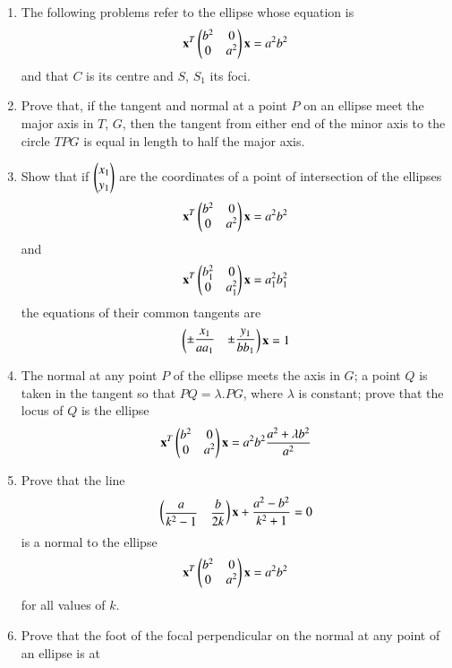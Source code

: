 \renewcommand{\theequation}{\theenumi}
\begin{enumerate}[label=\arabic*.,ref=\thesubsection.\theenumi]
\item The following problems refer to the ellipse whose 
equation is
\begin{align}
\mathbf{x}^T\begin{pmatrix}b^2 & 0\\0 & a^2\end{pmatrix}\mathbf{x} =a^2b^2
\end{align}
and that $C$ is its centre and $S$, $S_1$ its foci.

\item Prove that, if the tangent and normal at a point $P$ on an ellipse meet the major axis
in $T$, $G$, then the tangent from either end of the minor axis to the circle $TPG$ is equal in length to half the major
axis.
\item Show that if $\begin{pmatrix}x_1\\y_1\end{pmatrix}$ are the coordinates of a point of intersection of the ellipses
\begin{align}
\mathbf{x}^T\begin{pmatrix}b^2 & 0\\0 & a^2\end{pmatrix}\mathbf{x} =a^2b^2
\end{align}
 and 
\begin{align}
\mathbf{x}^T\begin{pmatrix}b_1^2 & 0\\0 & a_1^2\end{pmatrix}\mathbf{x} =a_1^2b_1^2
\end{align}
the equations of their common tangents are 
\begin{align}
\begin{pmatrix}\pm \dfrac{x_1}{aa_1} & \pm \dfrac{y_1}{bb_1}\end{pmatrix}\mathbf{x} = 1
\end{align}
\item The normal at any point $P$ of the ellipse meets the axis in $G$; a point $Q$ is taken in the
tangent so that $PQ=\lambda.PG$, where $\lambda$ is constant; prove that the locus of $Q$ is the ellipse
\begin{align}
\mathbf{x}^T\begin{pmatrix}b^2 & 0\\0 & a^2\end{pmatrix}\mathbf{x} =a^2b^2\frac{a^2+\lambda b^2}{a^2}
\end{align}
\item Prove that the line 
\begin{align}
\begin{pmatrix}\dfrac{a}{k^2-1} & \dfrac{b}{2k}\end{pmatrix}\mathbf{x} +\dfrac{a^2-b^2}{k^2+1} = 0
\end{align}
 is a normal to the ellipse 
\begin{align}
\mathbf{x}^T\begin{pmatrix}b^2 & 0\\0 & a^2\end{pmatrix}\mathbf{x} =a^2b^2
\end{align}
for all values of $k$.
\item Prove that the foot of the focal perpendicular on the normal at any point of an ellipse is at

\end{enumerate}
